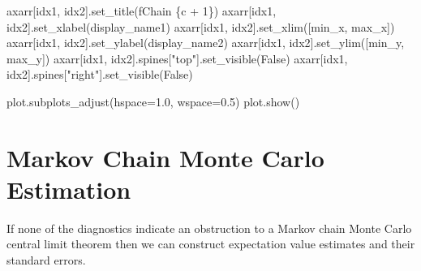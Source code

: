 \documentclass[
  letterpaper,
  DIV=11,
  numbers=noendperiod]{scrartcl}
\newenvironment{Shaded}{\begin{snugshade}}{\end{snugshade}}
\newcommand{\DecValTok}[1]{\textcolor[rgb]{0.68,0.00,0.00}{#1}}
\newcommand{\FloatTok}[1]{\textcolor[rgb]{0.68,0.00,0.00}{#1}}
\newcommand{\NormalTok}[1]{\textcolor[rgb]{0.00,0.23,0.31}{#1}}
\newcommand{\OperatorTok}[1]{\textcolor[rgb]{0.37,0.37,0.37}{#1}}
\newcommand{\SpecialCharTok}[1]{\textcolor[rgb]{0.37,0.37,0.37}{#1}}
\newcommand{\SpecialStringTok}[1]{\textcolor[rgb]{0.13,0.47,0.30}{#1}}
\newcommand{\StringTok}[1]{\textcolor[rgb]{0.13,0.47,0.30}{#1}}
\newcommand{\VariableTok}[1]{\textcolor[rgb]{0.07,0.07,0.07}{#1}}
\begin{document}
\begin{Shaded}
\begin{Highlighting}[]
\NormalTok{    axarr[idx1, idx2].set\_title(}\SpecialStringTok{f\textquotesingle{}Chain }\SpecialCharTok{\{}\NormalTok{c }\OperatorTok{+} \DecValTok{1}\SpecialCharTok{\}}\SpecialStringTok{\textquotesingle{}}\NormalTok{)}
\NormalTok{    axarr[idx1, idx2].set\_xlabel(display\_name1)}
\NormalTok{    axarr[idx1, idx2].set\_xlim([min\_x, max\_x])}
\NormalTok{    axarr[idx1, idx2].set\_ylabel(display\_name2)}
\NormalTok{    axarr[idx1, idx2].set\_ylim([min\_y, max\_y])}
\NormalTok{    axarr[idx1, idx2].spines[}\StringTok{"top"}\NormalTok{].set\_visible(}\VariableTok{False}\NormalTok{)}
\NormalTok{    axarr[idx1, idx2].spines[}\StringTok{"right"}\NormalTok{].set\_visible(}\VariableTok{False}\NormalTok{)}
  
\NormalTok{  plot.subplots\_adjust(hspace}\OperatorTok{=}\FloatTok{1.0}\NormalTok{, wspace}\OperatorTok{=}\FloatTok{0.5}\NormalTok{)}
\NormalTok{  plot.show()}
\end{Highlighting}
\end{Shaded}

\hypertarget{markov-chain-monte-carlo-estimation}{%
\section{Markov Chain Monte Carlo
Estimation}\label{markov-chain-monte-carlo-estimation}}

If none of the diagnostics indicate an obstruction to a Markov chain
Monte Carlo central limit theorem then we can construct expectation
value estimates and their standard errors.
\end{document}
